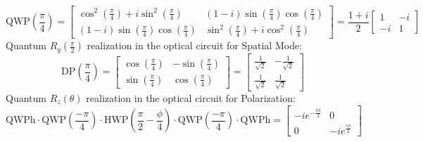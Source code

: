 \documentclass[
	a4paper,
	10pt,
	oneside,
]{article}
\begin{document}
\begin{equation}
 \text{QWP}(\frac{\pi}{4}) = 
    \begin{bmatrix}
		\cos^2 (\frac{\pi}{4}) + i \sin^2 (\frac{\pi}{4}) & (1-i) \sin(\frac{\pi}{4})\cos(\frac{\pi}{4})     \\
		(1-i) \sin(\frac{\pi}{4})\cos(\frac{\pi}{4})      & \sin^2 (\frac{\pi}{4}) + i \cos^2(\frac{\pi}{4})
	\end{bmatrix}
    = \frac{1+i}{2}
	\begin{bmatrix}
		1 & -i \\
		-i & 1
	\end{bmatrix}
\end{equation}
 Quantum $R_y(\frac{\pi}{2})$ realization in the optical circuit for Spatial Mode:
\begin{equation}
	\text{DP}(\frac{\pi}{4}) = \begin{bmatrix}
		\cos(\frac{\pi}{4}) & -\sin(\frac{\pi}{4}) \\
		\sin(\frac{\pi}{4}) & \cos(\frac{\pi}{4})
	\end{bmatrix} 
	= \begin{bmatrix}
		\frac{1}{\sqrt{2}} & -\frac{1}{\sqrt{2}} \\
		\frac{1}{\sqrt{2}} & \frac{1}{\sqrt{2}}
	\end{bmatrix}
\end{equation}
 Quantum $R_z(\theta)$ realization in the optical circuit for Polarization:
\begin{equation}
	\text{QWPh} \cdot \text{QWP}(\frac{-\pi}{4}) \cdot \text{HWP}(\frac{\pi}{2} - \frac{\phi}{4}) \cdot \text{QWP}(\frac{-\pi}{4}) \cdot \text{QWPh} = \begin{bmatrix}
	-ie^{-\frac{i\phi}{2}} & 0 \\
	0 & -ie^{\frac{i\phi}{2}}
\end{bmatrix}
\end{equation}
\end{document}
